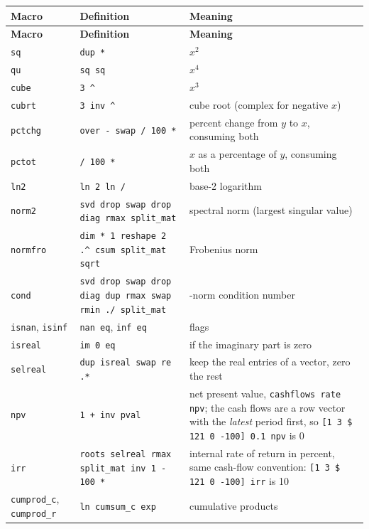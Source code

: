 \documentclass[11pt,letterpaper]{article}
\newcommand{\code}[1]{\texttt{#1}}
\begin{document}
\begin{longtable}{@{}>{\raggedright\arraybackslash}p{}>{\raggedright\arraybackslash}p{}>{\raggedright\arraybackslash}p{}@{}}
\toprule \textbf{Macro} & \textbf{Definition} & \textbf{Meaning} \\ \midrule \endfirsthead
\toprule \textbf{Macro} & \textbf{Definition} & \textbf{Meaning} \\ \midrule \endhead
\bottomrule \endlastfoot
\code{sq}      & \code{dup *}            & $x^2$ \\
\code{qu}      & \code{sq sq}            & $x^4$ \\
\code{cube}    & \code{3 \textasciicircum} & $x^3$ \\
\code{cubrt}   & \code{3 inv \textasciicircum} & cube root (complex for negative $x$) \\
\code{pctchg}  & \code{over - swap / 100 *} & percent change from $y$ to $x$, consuming both \\
\code{pctot}   & \code{/ 100 *}          & $x$ as a percentage of $y$, consuming both \\
\code{ln2}     & \code{ln 2 ln /}        & base-2 logarithm \\
\code{norm2}   & \code{svd drop swap drop diag rmax split\_mat} & spectral norm (largest singular value) \\
\code{normfro} & \code{dim * 1 reshape 2 .\textasciicircum{} csum split\_mat sqrt} & Frobenius norm \\
\code{cond}    & \code{svd drop swap drop diag dup rmax swap rmin ./ split\_mat} & 2-norm condition number \\
\code{isnan}, \code{isinf} & \code{nan eq}, \code{inf eq} & flags \\
\code{isreal}  & \code{im 0 eq}          & 1 if the imaginary part is zero \\
\code{selreal} & \code{dup isreal swap re .*} & keep the real entries of a vector, zero the rest \\
\code{npv}     & \code{1 + inv pval}     & net present value, \code{cashflows rate npv}; the cash flows are a row vector with the \emph{latest} period first, so \code{[1 3 \$ 121 0 -100] 0.1 npv} is 0 \\
\code{irr}     & \code{roots selreal rmax split\_mat inv 1 - 100 *} & internal rate of return in percent, same cash-flow convention: \code{[1 3 \$ 121 0 -100] irr} is 10 \\
\code{cumprod\_c}, \code{cumprod\_r} & \code{ln cumsum\_c exp} & cumulative products \\

\end{longtable}
\end{document}
